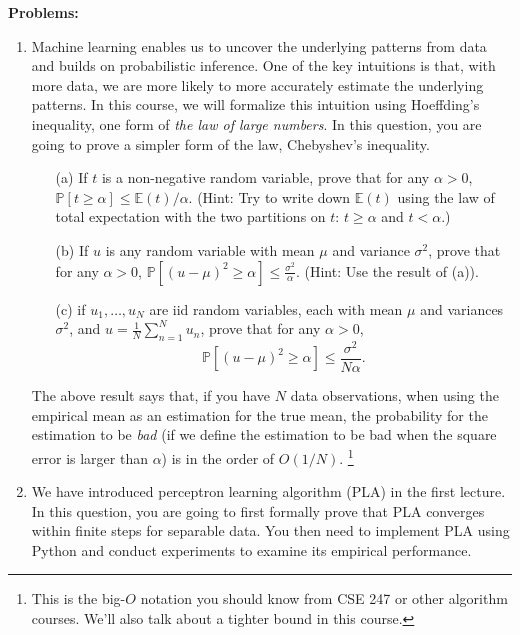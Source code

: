 \documentclass[11pt]{article}
\begin{document}
\noindent \textbf{Problems:}

\begin{enumerate}

\item Machine learning enables us to uncover the underlying patterns from data and builds on probabilistic inference. One of the key intuitions is that, with more data, we are more likely to more accurately estimate the underlying patterns. In this course, we will formalize this intuition using Hoeffding's inequality, one form of \emph{the law of large numbers}. In this question, you are going to prove a simpler form of the law, Chebyshev's inequality.
\begin{itemize}
    \item[(a)] If $t$ is a non-negative random variable, prove that for any $\alpha>0$, $\mathds{P}[t\geq\alpha]\leq \mathds{E}(t)/\alpha$. (Hint: Try to write down $\mathds{E}(t)$ using the law of total expectation with the two
partitions on $t$: $t \geq\alpha$ and $t < \alpha$.)
    \item[(b)] If $u$  is any random variable with mean $\mu$ and variance $\sigma^2$, prove that for any $\alpha>0$, $\mathds{P}[(u-\mu)^2\geq\alpha]\leq\frac{\sigma^2}{\alpha}$. (Hint: Use the result of (a)).
    \item[(c)] if $u_1,\ldots,u_N$ are iid random variables, each with mean $\mu$ and variances $\sigma^2$, and $u=\frac{1}{N}\sum_{n=1}^Nu_n$, prove that for any $\alpha>0$,
    \[
        \mathds{P}[(u-\mu)^2\geq\alpha]\leq\frac{\sigma^2}{N\alpha}.
    \]
\end{itemize}

The above result says that, if you have $N$ data observations,
when using the empirical mean as an estimation for the true mean, 
the probability for the estimation to be \emph{bad} (if we define the estimation to be bad when the square error is larger than $\alpha$) is in the order of $O(1/N)$. \footnote{This is the big-$O$ notation you should know from CSE 247 or other algorithm courses. We'll also talk about a tighter bound in this course.}

\item We have introduced perceptron learning algorithm (PLA) in the first lecture. In this question, you are going to first formally prove that PLA converges within finite steps for separable data. You then need to implement PLA using Python and conduct experiments to examine its empirical performance.

\begin{itemize}


\end{itemize}
\end{enumerate}
\end{document}
